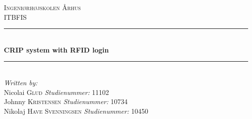 \newcommand{\HRule}{\rule{\linewidth}{0.5mm}} %

\begin{center} %
 

\textsc{\LARGE Ingeniørhøjskolen Århus}\\[1.5cm] %
\textsc{\large ITBFIS}\\[0.5cm] %


\HRule \\[0.4cm]
{ \huge \bfseries CRIP system with RFID login}\\[0.4cm] %
\HRule \\[1.5cm]
 

\Large \emph{Written by:}\\
Nicolai \textsc{Glud} \textit{Studienummer:} 11102\\
Johnny \textsc{Kristensen} \textit{Studienummer:} 10734\\
Nikolaj \textsc{Have Svenningsen} \textit{Studienummer:} 10450\\



\end{center}
